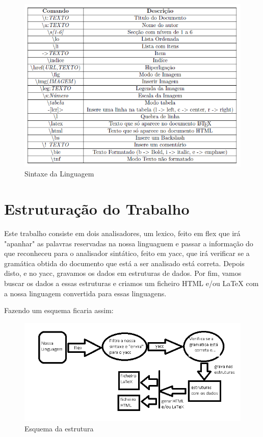 \documentclass{report}
\begin{document}
\begin{figure}[h]
\centering
\includegraphics[scale=0.7]{sintaxe.PNG}
\caption{Sintaxe da Linguagem}
\label{Linguagem}
\end{figure}


\chapter{Estruturação do Trabalho}

Este trabalho consiste em dois analisadores, um lexico, feito em flex que irá "apanhar" as palavras reservadas na nossa linguaguem e passar a informação do que reconheceu para o analisador sintático, feito em yacc, que irá verificar se a gramática obtida do documento que está a ser analisado está correta.
Depois disto, e no yacc, gravamos os dados em estruturas de dados. Por fim, vamos buscar os dados a essas estruturas e criamos um ficheiro HTML e/ou LaTeX com a nossa linguagem convertida para essas linguagens.

Fazendo um esquema ficaria assim:

\begin{figure}[h]
\centering
\includegraphics[scale=0.6]{esq.png}
\caption{Esquema da estrutura}
\label{Estrutura}
\end{figure}
\end{document}
